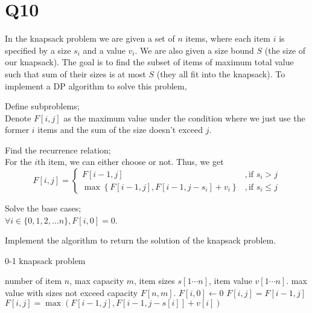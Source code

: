 \documentclass[11pt]{article}
\begin{document}
\section*{Q10}
In the knapsack problem we are given a set of $n$ items, where
each item $i$ is speciﬁed by a size $s_i$ and a value $v_i$. We are also
given a size bound $S$ (the size of our knapsack). The goal is to
ﬁnd the subset of items of maximum total value such that sum
of their sizes is at most $S$ (they all ﬁt into the knapsack).
To implement a DP algorithm to solve this problem,
\begin{qparts}
    
    \item Deﬁne subproblems;\\
    Denote $F[i,j]$ as the maximum value under the condition where we just use the former $i$ items and the sum of the size doesn't exceed $j$.

    \item Find the recurrence relation;\\
    For the $i$th item, we can either choose or not. Thus, we get
    $$
    F[i,j]=
    \begin{cases}
        F[i-1,j]&,\text{if $s_i>j$}\\
        \max \left\{ F[i-1,j],F[i-1,j-s_i]+v_i \right\} &,\text{if $s_i\le j$}
    \end{cases}
    $$

    \item Solve the base cases;\\
    $\forall i \in \{ 0,1,2, \ldots n \},F[i,0]=0$.

    \item Implement the algorithm to return the solution of the
    knapsack problem.\\
    \begin{algorithm}
    \caption{0-1 knapsack problem}
        \begin{algorithmic}
            \Require number of item $n$, max capacity $m$, item sizes $s[1\cdots n]$, item value $v[1\cdots n]$.
            \Ensure max value with sizes not exceed capacity $F[n,m]$.
            \State $F[i,0]\gets 0$
            \EndFor
            \State $F[i,j]=F[i-1,j]$
            \Else
            \State $F[i,j]=\max\left( F[i-1,j],F[i-1,j-s[i]]+v[i] \right) $
            \EndIf
            \EndFor
            \EndFor
        \end{algorithmic}
    \end{algorithm}
\end{qparts}
\end{document}
